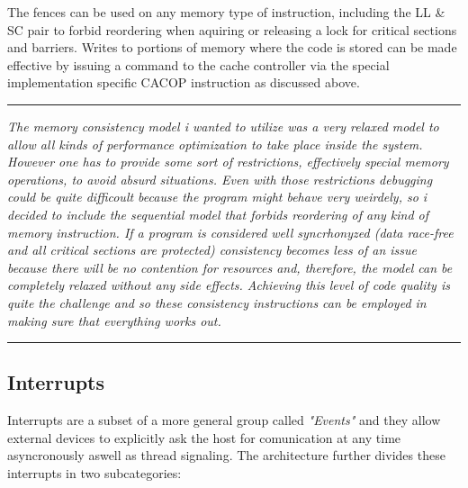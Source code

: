 \documentclass{article}
\begin{document}
            The fences can be used on any memory type of instruction, including the LL & SC pair to forbid reordering when aquiring or releasing a lock for critical sections and barriers. Writes to portions of memory where the code is stored can be made effective by issuing a command to the cache controller via the special implementation specific CACOP instruction as discussed above.

        \par\noindent\rule{\textwidth}{0.4pt}
        \textit{The memory consistency model i wanted to utilize was a very relaxed model to allow all kinds of performance optimization to take place inside the system. However one has to provide some sort of restrictions, effectively special memory operations, to avoid absurd situations. Even with those restrictions debugging could be quite difficoult because the program might behave very weirdely, so i decided to include the sequential model that forbids reordering of any kind of memory instruction. If a program is considered well syncrhonyzed (data race-free and all critical sections are protected) consistency becomes less of an issue because there will be no contention for resources and, therefore, the model can be completely relaxed without any side effects. Achieving this level of code quality is quite the challenge and so these consistency instructions can be employed in making sure that everything works out.}
        \par\noindent\rule{\textwidth}{0.4pt}

        \subsection{Interrupts} %

            Interrupts are a subset of a more general group called \textit{"Events"} and they allow external devices to explicitly ask the host for comunication at any time asyncronously aswell as thread signaling. The architecture further divides these interrupts in two subcategories:
\end{document}
